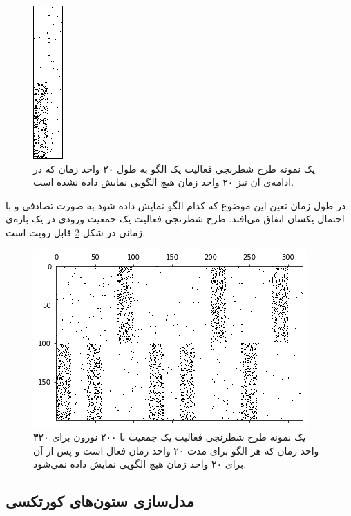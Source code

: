 \documentclass[12pt]{report}
\begin{document}
\begin{figure}[H]
	\centering
	\includegraphics[width=0.1\linewidth]{input-single.png}
	\caption[NS]{
		یک نمونه طرح شطرنجی فعالیت یک الگو به طول ۲۰ واحد زمان که در ادامه‌ی آن نیز ۲۰ واحد زمان هیچ الگویی نمایش داده نشده است.
	}
	\label{fig:input-single} 
\end{figure}
	
	در طول زمان تعین این موضوع که کدام الگو نمایش داده شود به صورت تصادفی و با احتمال یکسان اتفاق می‌افتد. طرح شطرنجی فعالیت یک جمعیت ورودی در یک بازه‌ی زمانی در شکل \ref{fig:input-range} قابل رویت است.
	
\begin{figure}[H]
	\centering
	\includegraphics[width=1.0\linewidth]{input-range.png}
	\caption[NS]{
		یک نمونه طرح شطرنجی فعالیت یک جمعیت با ۲۰۰ نورون برای ۳۲۰ واحد زمان که هر الگو برای مدت ۲۰ واحد زمان فعال است و پس از آن برای ۲۰ واحد زمان هیچ الگویی نمایش داده نمی‌شود.
	}
	\label{fig:input-range} 
\end{figure}
	
	\subsection{مدل‌سازی ستون‌های کورتکسی}
	
\end{document}
